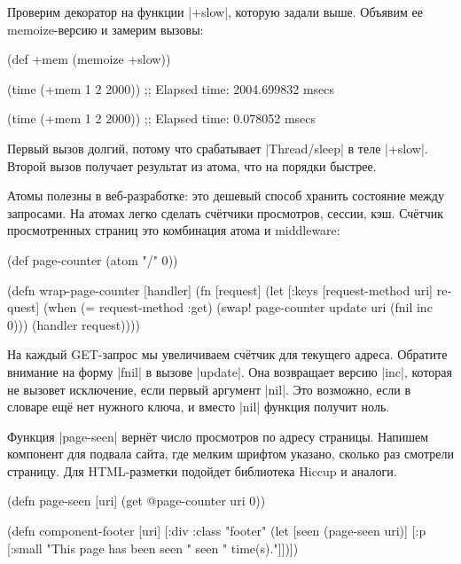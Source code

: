 Проверим декоратор на функции \spverb|+slow|, которую задали выше. Объявим ее
memoize-версию и замерим вызовы:

\begin{english}
  \begin{clojure}
(def +mem (memoize +slow))

(time (+mem 1 2 2000))
;; Elapsed time: 2004.699832 msecs

(time (+mem 1 2 2000))
;; Elapsed time: 0.078052 msecs
  \end{clojure}
\end{english}

Первый вызов долгий, потому что срабатывает \spverb|Thread/sleep| в теле
\spverb|+slow|. Второй вызов получает результат из атома, что на порядки
быстрее.

Атомы полезны в веб-разработке: это дешевый способ хранить состояние между
запросами. На атомах легко сделать сч\"{е}тчики просмотров, сессии, кэш. Сч\"{е}тчик
просмотренных страниц это комбинация атома и middleware:

\begin{english}
  \begin{clojure}
(def page-counter
  (atom {"/" 0}))

(defn wrap-page-counter
  [handler]
  (fn [request]
    (let [{:keys [request-method uri]} request]
      (when (= request-method :get)
        (swap! page-counter update uri (fnil inc 0)))
      (handler request))))
  \end{clojure}
\end{english}

На каждый GET-запрос мы увеличиваем сч\"{е}тчик для текущего адреса. Обратите
внимание на форму \spverb|fnil| в вызове \spverb|update|. Она возвращает версию
\spverb|inc|, которая не вызовет исключение, если первый аргумент
\spverb|nil|. Это возможно, если в словаре ещ\"{е} нет нужного ключа, и вместо
\spverb|nil| функция получит ноль.

Функция \spverb|page-seen| верн\"{е}т число просмотров по адресу страницы. Напишем
компонент для подвала сайта, где мелким шрифтом указано, сколько раз смотрели
страницу. Для HTML-разметки подойдет библиотека
Hiccup и аналоги.

\begin{english}
  \begin{clojure}
(defn page-seen [uri]
  (get @page-counter uri 0))

(defn component-footer [uri]
  [:div {:class "footer"}
   (let [seen (page-seen uri)]
     [:p [:small "This page has been seen " seen " time(s)."]])])
  \end{clojure}
\end{english}

